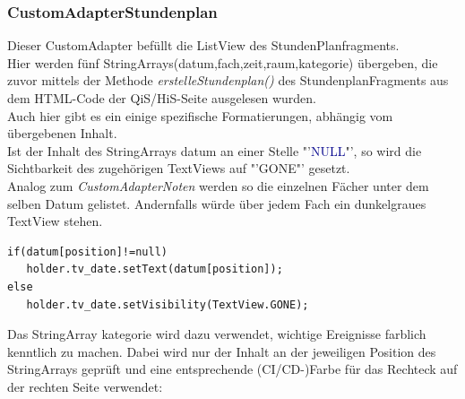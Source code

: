 \begin{description}
\subsubsection{CustomAdapterStundenplan}
Dieser CustomAdapter befüllt die ListView des StundenPlanfragments.\\
Hier werden fünf StringArrays(\textcolor{lila}{datum},\textcolor{lila}{fach},\textcolor{lila}{zeit},\textcolor{lila}{raum},\textcolor{lila}{kategorie}) übergeben, die zuvor mittels der Methode \textit{erstelleStundenplan()} des StundenplanFragments aus dem HTML-Code der QiS/HiS-Seite ausgelesen wurden.\\
Auch hier gibt es ein einige spezifische Formatierungen, abhängig vom übergebenen Inhalt.\\
Ist der Inhalt des StringArrays \textcolor{lila}{datum} an einer Stelle "'\textcolor{darkblue}{NULL}"', so wird die Sichtbarkeit des zugehörigen TextViews auf  "'\textcolor{lila}{GONE}"' gesetzt.\\
Analog zum \textit{CustomAdapterNoten} werden so die einzelnen Fächer unter dem selben Datum gelistet. Andernfalls würde über jedem Fach ein dunkelgraues TextView stehen.
\begin{lstlisting}
if(datum[position]!=null)
   holder.tv_date.setText(datum[position]);
else
   holder.tv_date.setVisibility(TextView.GONE);
\end{lstlisting}
Das StringArray \textcolor{lila}{kategorie} wird dazu verwendet, wichtige Ereignisse farblich kenntlich zu machen. Dabei wird nur der Inhalt an der jeweiligen Position des StringArrays geprüft und eine entsprechende (CI/CD-)Farbe für das Rechteck auf der rechten Seite verwendet:


\end{description}
